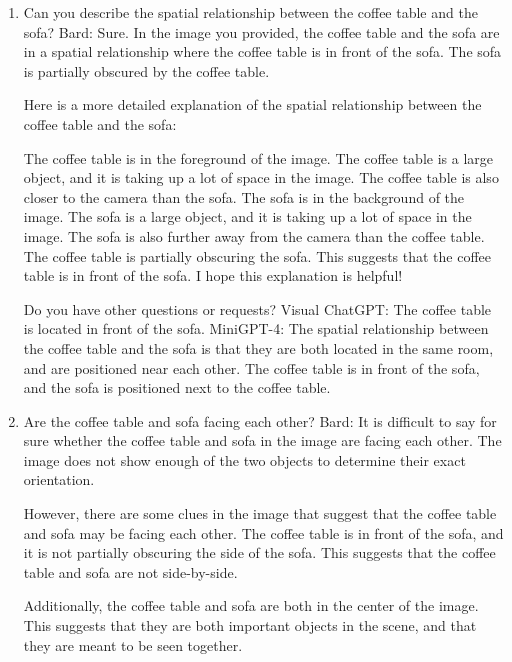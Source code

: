 \begin{enumerate}
    \item Can you describe the spatial relationship between the coffee table and the sofa?
    \subitem Bard: 
    Sure. In the image you provided, the coffee table and the sofa are in a spatial relationship where the coffee table is in front of the sofa. The sofa is partially obscured by the coffee table.
    
    Here is a more detailed explanation of the spatial relationship between the coffee table and the sofa:
    
    The coffee table is in the foreground of the image. The coffee table is a large object, and it is taking up a lot of space in the image. The coffee table is also closer to the camera than the sofa.
    The sofa is in the background of the image. The sofa is a large object, and it is taking up a lot of space in the image. The sofa is also further away from the camera than the coffee table.
    The coffee table is partially obscuring the sofa. This suggests that the coffee table is in front of the sofa.
    I hope this explanation is helpful!
    
    Do you have other questions or requests?
    \subitem Visual ChatGPT: The coffee table is located in front of the sofa.
    \subitem MiniGPT-4: The spatial relationship between the coffee table and the sofa is that they are both located in the same room, and are positioned near each other. The coffee table is in front of the sofa, and the sofa is positioned next to the coffee table.
    \item Are the coffee table and sofa facing each other?
    \subitem Bard: 
    It is difficult to say for sure whether the coffee table and sofa in the image are facing each other. The image does not show enough of the two objects to determine their exact orientation.
    
    However, there are some clues in the image that suggest that the coffee table and sofa may be facing each other. The coffee table is in front of the sofa, and it is not partially obscuring the side of the sofa. This suggests that the coffee table and sofa are not side-by-side.
    
    Additionally, the coffee table and sofa are both in the center of the image. This suggests that they are both important objects in the scene, and that they are meant to be seen together.
    

\end{enumerate}
